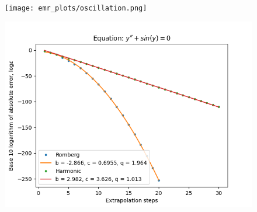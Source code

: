 \begin{figure}[H]
\centering
\begin{minipage}{0.45\textwidth}
\centering
\texttt{[image: emr\_plots/oscillation.png]}
\end{minipage}
\begin{minipage}{0.45\textwidth}
\centering
\includegraphics[scale=0.45]{emr_plots/oscillation_hp_steps.png}
\end{minipage}
\end{figure}

